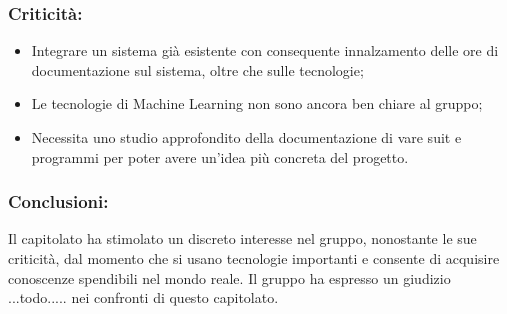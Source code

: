 		\subsubsection{Criticità:}
			\begin{itemize}
				\item Integrare un sistema già esistente con consequente innalzamento delle ore di documentazione sul sistema, oltre che sulle tecnologie;
				\item Le tecnologie di Machine Learning non sono ancora ben chiare al gruppo;
				\item Necessita uno studio approfondito della documentazione di vare suit e programmi per poter avere un'idea più concreta del progetto.
			\end{itemize}

		\subsubsection{Conclusioni:}
			Il capitolato ha stimolato un discreto interesse nel gruppo, nonostante le sue criticità, dal momento che si usano tecnologie importanti e consente di acquisire conoscenze spendibili nel mondo reale. Il gruppo ha espresso un giudizio ...todo..... nei confronti di questo capitolato.
